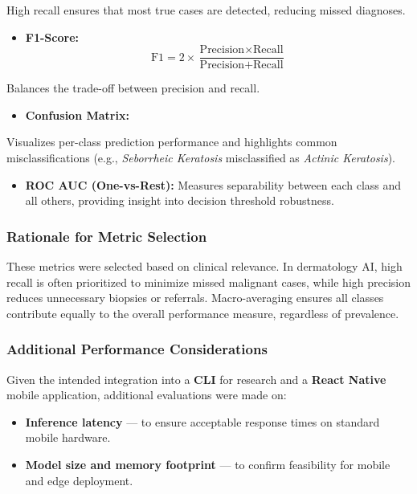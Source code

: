 \documentclass[
  12pt,
  oneside]{article}
\providecommand{\tightlist}{%
  \setlength{\itemsep}{0pt}\setlength{\parskip}{0pt}}
\begin{document}
High recall ensures that most true cases are detected, reducing missed
diagnoses.

\begin{itemize}
\tightlist
\item
  \textbf{F1-Score:} \[
  \text{F1} = 2 \times \frac{\text{Precision} \times \text{Recall}}{\text{Precision} + \text{Recall}}
  \]
\end{itemize}

Balances the trade-off between precision and recall.

\begin{itemize}
\tightlist
\item
  \textbf{Confusion Matrix:}
\end{itemize}

Visualizes per-class prediction performance and highlights common
misclassifications (e.g., \emph{Seborrheic Keratosis} misclassified as
\emph{Actinic Keratosis}).

\begin{itemize}
\tightlist
\item
  \textbf{ROC AUC (One-vs-Rest):} Measures separability between each
  class and all others, providing insight into decision threshold
  robustness.
\end{itemize}

\subsubsection{Rationale for Metric
Selection}\label{rationale-for-metric-selection}

These metrics were selected based on clinical relevance. In dermatology
AI, high recall is often prioritized to minimize missed malignant cases,
while high precision reduces unnecessary biopsies or referrals.
Macro-averaging ensures all classes contribute equally to the overall
performance measure, regardless of prevalence.

\subsubsection{Additional Performance
Considerations}\label{additional-performance-considerations}

Given the intended integration into a \textbf{CLI} for research and a
\textbf{React Native} mobile application, additional evaluations were
made on:

\begin{itemize}
\tightlist
\item
  \textbf{Inference latency} --- to ensure acceptable response times on
  standard mobile hardware.
\item
  \textbf{Model size and memory footprint} --- to confirm feasibility
  for mobile and edge deployment.
\end{itemize}
\end{document}
